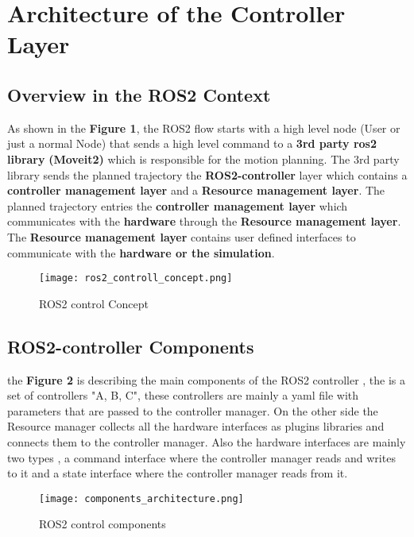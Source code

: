 \section{Architecture of the Controller Layer}

\subsection{Overview in the ROS2 Context}

As shown in the \textbf{Figure 1}, the ROS2 flow  starts with a high level node (User or just a normal Node) that sends a high level command to a 
\textbf{3rd party ros2 library} \textbf{(Moveit2)} which is responsible for the motion planning.
The 3rd party library sends the planned trajectory the \textbf{ROS2-controller} layer which contains a \textbf{controller management layer} and a \textbf{ Resource management layer}.
The planned trajectory entries the \textbf{controller management layer} which communicates with the \textbf{hardware} through the \textbf{ Resource management layer}.
The \textbf{ Resource management layer} contains user defined interfaces to communicate with the \textbf{hardware or the simulation}.\cite{ros2controllersoverview}


\begin{figure}[h]
    \centering
    \texttt{[image: ros2\_controll\_concept.png]}
    \caption{ROS2 control Concept}
    \label{fig:mesh2}
\end{figure}

\newpage

\subsection{ROS2-controller Components}

the \textbf{Figure 2} is describing the main components of the ROS2 controller , the is a set of controllers 
"A, B, C", these controllers are mainly a yaml file with parameters that are passed to the controller manager.
On the other side the Resource manager collects all the hardware interfaces as plugins libraries and connects them to the controller manager.
Also the hardware interfaces are mainly two types , a command interface where the controller manager reads and writes to it and a state interface where the controller manager reads from it.\cite{ros2controllersarch}

\begin{figure}[h]
    \centering
    \texttt{[image: components\_architecture.png]}
    \caption{ROS2 control components}
    \label{fig:mesh3}
\end{figure}

